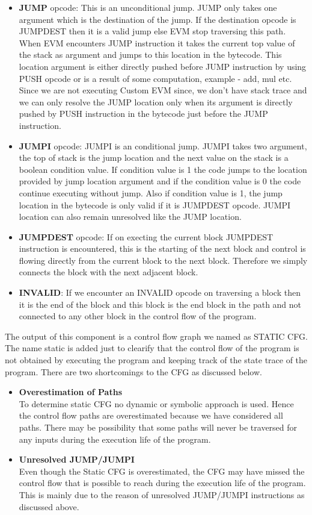 \documentclass{article}
\begin{document}
\begin{itemize}
    \item \textbf{JUMP} opcode: This is an unconditional jump. JUMP only takes one argument which is the destination of the jump. If the destination opcode is JUMPDEST then it is a valid jump else EVM stop traversing this path. When EVM encounters JUMP instruction it takes the current top value of the stack as argument and jumps to this location in the bytecode. This location argument is either directly pushed before JUMP instruction by using PUSH opcode or is a result of some computation, example - add, mul etc. Since we are not executing Custom EVM since, we don't have stack trace and we can only resolve the JUMP location only when its argument is directly pushed by PUSH instruction in the bytecode just before the JUMP instruction.
    \item \textbf{JUMPI} opcode: JUMPI is an conditional jump. JUMPI takes two argument, the top of stack is the jump location and the next value on the stack is a boolean condition value. If condition value is 1 the code jumps to the location provided by jump location argument and if the condition value is 0 the code continue executing without jump. Also if condition value is 1, the jump location in the bytecode is only valid if it is JUMPDEST opcode. JUMPI location can also remain unresolved like the JUMP location.
    \item \textbf{JUMPDEST} opcode: If on execting the current block JUMPDEST instruction is encountered, this is the starting of the next block and control is flowing directly from the current block to the next block. Therefore we simply connects the block with the next adjacent block.
    \item \textbf{INVALID}: If we encounter an INVALID opcode on traversing a block then it is the end of the block and this block is the end block in the path and not connected to any other block  in the control flow of the program.
\end{itemize}
The output of this component is a control flow graph we named as STATIC CFG. The name static is added just to clearify that the control flow of the program is not obtained by executing the program and keeping track of the state trace of the program. There are two shortcomings to the CFG as discussed below.
\begin{itemize}
    \item \textbf{Overestimation of Paths}\\
    To determine static CFG no dynamic or symbolic approach is used. Hence the control flow paths are overestimated because we have considered all paths. There may be possibility that some paths will never be traversed for any inputs during the execution life of the program.
    \item \textbf{Unresolved JUMP/JUMPI}\\
    Even though the Static CFG is overestimated, the CFG may have missed the control flow that is possible to reach during the execution life of the program. This is mainly due to the reason of unresolved JUMP/JUMPI instructions as discussed above.
\end{itemize}
\end{document}
